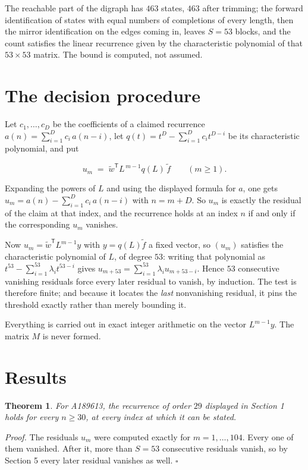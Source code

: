 \documentclass[11pt]{article}
\newtheorem{theorem}{Theorem}
\theoremstyle{definition}
\begin{document}
The reachable part of the digraph has $463$ states, $463$ after trimming; the forward identification of states with equal numbers of completions of every length, then the mirror identification on the edges coming in, leaves $S = 53$ blocks, and the count satisfies the linear recurrence given by the characteristic polynomial of that $53\times53$ matrix. The bound is computed, not assumed.

\section{The decision procedure}

Let $c_1,\dots,c_D$ be the coefficients of a claimed recurrence $a(n) = \sum_{i=1}^{D} c_i\,a(n-i)$, let $q(t) = t^{D} - \sum_{i=1}^{D} c_i t^{D-i}$ be its characteristic polynomial, and put

\[u_m \;=\; \tilde w^{\mathsf T} L^{\,m-1} q(L)\,\tilde f \qquad (m \ge 1).\]

Expanding the powers of $L$ and using the displayed formula for $a$, one gets $u_m = a(n) - \sum_{i=1}^{D} c_i\,a(n-i)$ with $n = m + D$. So $u_m$ is exactly the residual of the claim at that index, and the recurrence holds at an index $n$ if and only if the corresponding $u_m$ vanishes.

Now $u_m = \tilde w^{\mathsf T} L^{m-1} y$ with $y = q(L)\tilde f$ a fixed vector, so $(u_m)$ satisfies the characteristic polynomial of $L$, of degree $53$: writing that polynomial as $t^{53} - \sum_{i=1}^{53} \lambda_i t^{53-i}$ gives $u_{m+53} = \sum_{i=1}^{53} \lambda_i u_{m+53-i}$. Hence $53$ consecutive vanishing residuals force every later residual to vanish, by induction. The test is therefore finite; and because it locates the {\itshape last} nonvanishing residual, it pins the threshold exactly rather than merely bounding it.

Everything is carried out in exact integer arithmetic on the vector $L^{m-1}y$. The matrix $M$ is never formed.

\section{Results}

\begin{theorem} For A189613, the recurrence of order $29$ displayed in Section 1 holds for every $n \ge 30$, at every index at which it can be stated.\end{theorem}

{\itshape Proof.} The residuals $u_m$ were computed exactly for $m = 1,\dots,104$. Every one of them vanished. After it, more than $S = 53$ consecutive residuals vanish, so by Section 5 every later residual vanishes as well. $\square$
\end{document}
